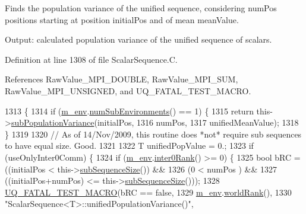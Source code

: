 Finds the population variance of the unified sequence, considering {\ttfamily num\-Pos} positions starting at position {\ttfamily initial\-Pos} and of mean {\ttfamily mean\-Value}. 

Output\-: calculated population variance of the unified sequence of scalars. 

Definition at line 1308 of file Scalar\-Sequence.\-C.



References Raw\-Value\-\_\-\-M\-P\-I\-\_\-\-D\-O\-U\-B\-L\-E, Raw\-Value\-\_\-\-M\-P\-I\-\_\-\-S\-U\-M, Raw\-Value\-\_\-\-M\-P\-I\-\_\-\-U\-N\-S\-I\-G\-N\-E\-D, and U\-Q\-\_\-\-F\-A\-T\-A\-L\-\_\-\-T\-E\-S\-T\-\_\-\-M\-A\-C\-R\-O.


\begin{DoxyCode}
1313 \{
1314   \textcolor{keywordflow}{if} (\hyperlink{class_q_u_e_s_o_1_1_scalar_sequence_a71618cd6351b29361b437af68447a4c8}{m\_env}.\hyperlink{class_q_u_e_s_o_1_1_base_environment_ac0345f57e31ef7833e379ed972bd094d}{numSubEnvironments}() == 1) \{
1315     \textcolor{keywordflow}{return} this->\hyperlink{class_q_u_e_s_o_1_1_scalar_sequence_a997bf4ce6fc322d71c509f8d622ad538}{subPopulationVariance}(initialPos,
1316                                        numPos,
1317                                        unifiedMeanValue);
1318   \}
1319 
1320   \textcolor{comment}{// As of 14/Nov/2009, this routine does *not* require sub sequences to have equal size. Good.}
1321 
1322   T unifiedPopValue = 0.;
1323   \textcolor{keywordflow}{if} (useOnlyInter0Comm) \{
1324     \textcolor{keywordflow}{if} (\hyperlink{class_q_u_e_s_o_1_1_scalar_sequence_a71618cd6351b29361b437af68447a4c8}{m\_env}.\hyperlink{class_q_u_e_s_o_1_1_base_environment_ae106b5bb8a80b655b88b3a26b1e7c185}{inter0Rank}() >= 0) \{
1325       \textcolor{keywordtype}{bool} bRC = ((initialPos          <  this->\hyperlink{class_q_u_e_s_o_1_1_scalar_sequence_a0288ea295eedc216a1617b3286f6f3a0}{subSequenceSize}()) &&
1326                   (0                   <  numPos                 ) &&
1327                   ((initialPos+numPos) <= this->\hyperlink{class_q_u_e_s_o_1_1_scalar_sequence_a0288ea295eedc216a1617b3286f6f3a0}{subSequenceSize}()));
1328       \hyperlink{_defines_8h_a56d63d18d0a6d45757de47fcc06f574d}{UQ\_FATAL\_TEST\_MACRO}(bRC == \textcolor{keyword}{false},
1329                           \hyperlink{class_q_u_e_s_o_1_1_scalar_sequence_a71618cd6351b29361b437af68447a4c8}{m\_env}.\hyperlink{class_q_u_e_s_o_1_1_base_environment_a78b57112bbd0e6dd0e8afec00b40ffa7}{worldRank}(),
1330                           \textcolor{stringliteral}{"ScalarSequence<T>::unifiedPopulationVariance()"},

\end{DoxyCode}
